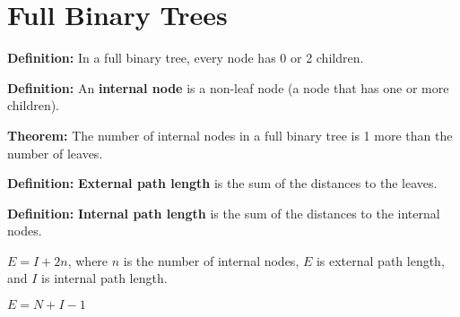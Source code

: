 \section{Full Binary Trees}

\textbf{Definition:} In a full binary tree, every node has 0 or 2 children.

\textbf{Definition:} An \textbf{internal node} is a non-leaf node (a node that has one or more children).

\textbf{Theorem:} The number of internal nodes in a full binary tree is 1 more than the number of leaves.

\textbf{Definition:} \textbf{External path length} is the sum of the distances to the leaves.

\textbf{Definition:} \textbf{Internal path length} is the sum of the distances to the internal nodes.

$E = I + 2n$, where $n$ is the number of internal nodes, $E$ is external path length, and $I$ is internal path length.

$E = N + I - 1$
